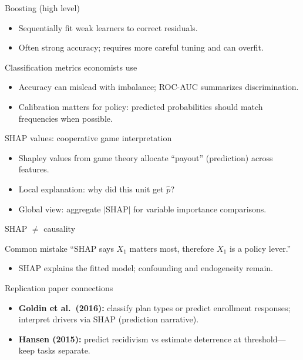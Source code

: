 \documentclass[aspectratio=169,11pt]{beamer}
\begin{document}
\begin{frame}{Boosting (high level)}
  \begin{itemize}
    \item Sequentially fit weak learners to correct residuals.
    \item Often strong accuracy; requires more careful tuning and can overfit.
  \end{itemize}
\end{frame}

\begin{frame}{Classification metrics economists use}
  \begin{itemize}
    \item Accuracy can mislead with imbalance; ROC-AUC summarizes discrimination.
    \item Calibration matters for policy: predicted probabilities should match frequencies when possible.
  \end{itemize}
\end{frame}

\begin{frame}{SHAP values: cooperative game interpretation}
  \begin{itemize}
    \item Shapley values from game theory allocate ``payout'' (prediction) across features.
    \item Local explanation: why did this unit get \(\widehat{p}\)?
    \item Global view: aggregate \(|\text{SHAP}|\) for variable importance comparisons.
  \end{itemize}
\end{frame}

\begin{frame}{SHAP \(\neq\) causality}
  \begin{alertblock}{Common mistake}
    ``SHAP says \(X_1\) matters most, therefore \(X_1\) is a policy lever.''
  \end{alertblock}
  \begin{itemize}
    \item SHAP explains the fitted model; confounding and endogeneity remain.
  \end{itemize}
\end{frame}

\begin{frame}{Replication paper connections}
  \begin{itemize}
    \item \textbf{Goldin et al.\ (2016):} classify plan types or predict enrollment responses; interpret drivers via SHAP (prediction narrative).
    \item \textbf{Hansen (2015):} predict recidivism vs estimate deterrence at threshold---keep tasks separate.
  \end{itemize}
\end{frame}
\end{document}
